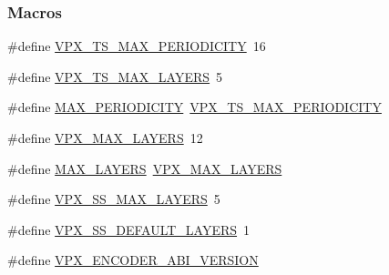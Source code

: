 \subsubsection*{Macros}
\begin{DoxyCompactItemize}
\item 
\#define \hyperlink{group__encoder_ga684b48cb6e47a258247637186557eb19}{V\+P\+X\+\_\+\+T\+S\+\_\+\+M\+A\+X\+\_\+\+P\+E\+R\+I\+O\+D\+I\+C\+I\+TY}~16
\item 
\#define \hyperlink{group__encoder_ga2715ac3dd8bf2f5438c4bbfc82788eb2}{V\+P\+X\+\_\+\+T\+S\+\_\+\+M\+A\+X\+\_\+\+L\+A\+Y\+E\+RS}~5
\item 
\#define \hyperlink{group__encoder_gae6569d89cc61cb190aeeb00a1b40ad88}{M\+A\+X\+\_\+\+P\+E\+R\+I\+O\+D\+I\+C\+I\+TY}~\hyperlink{group__encoder_ga684b48cb6e47a258247637186557eb19}{V\+P\+X\+\_\+\+T\+S\+\_\+\+M\+A\+X\+\_\+\+P\+E\+R\+I\+O\+D\+I\+C\+I\+TY}
\item 
\#define \hyperlink{group__encoder_ga6edf57208cc368274e905c4d87dccf2e}{V\+P\+X\+\_\+\+M\+A\+X\+\_\+\+L\+A\+Y\+E\+RS}~12
\item 
\#define \hyperlink{group__encoder_gade9d4b2ac5f29fe89ffea40e7c58c9d6}{M\+A\+X\+\_\+\+L\+A\+Y\+E\+RS}~\hyperlink{group__encoder_ga6edf57208cc368274e905c4d87dccf2e}{V\+P\+X\+\_\+\+M\+A\+X\+\_\+\+L\+A\+Y\+E\+RS}
\item 
\#define \hyperlink{group__encoder_ga8ee6b12a5f4c97d9767adffb88fff7da}{V\+P\+X\+\_\+\+S\+S\+\_\+\+M\+A\+X\+\_\+\+L\+A\+Y\+E\+RS}~5
\item 
\#define \hyperlink{group__encoder_ga8324b8c1ebf8a80253d544584f9439eb}{V\+P\+X\+\_\+\+S\+S\+\_\+\+D\+E\+F\+A\+U\+L\+T\+\_\+\+L\+A\+Y\+E\+RS}~1
\item 
\#define \hyperlink{group__encoder_gaa4f0b52293c08ba672429c3a03648b9d}{V\+P\+X\+\_\+\+E\+N\+C\+O\+D\+E\+R\+\_\+\+A\+B\+I\+\_\+\+V\+E\+R\+S\+I\+ON}\hypertarget{group__encoder_gaa4f0b52293c08ba672429c3a03648b9d}{}\label{group__encoder_gaa4f0b52293c08ba672429c3a03648b9d}


\end{DoxyCompactItemize}
